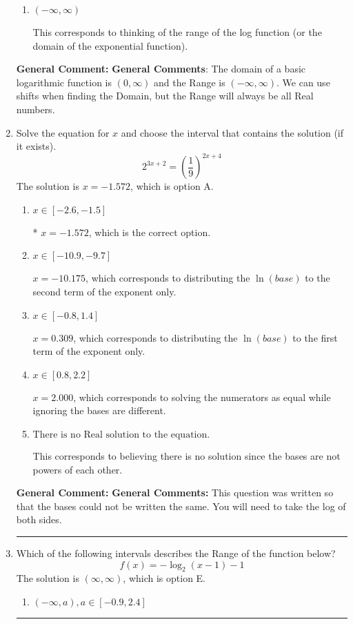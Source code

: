 \documentclass{extbook}[14pt]
\newcommand{\litem}[1]{\item #1

\rule{\textwidth}{0.4pt}}
\begin{document}
\begin{enumerate}
{\begin{enumerate}[label=\Alph*.]
$[-8, \infty)$, which corresponds to using the vertical shift when shifting the Domain AND including the endpoint.
\item \( (-\infty, \infty) \)

This corresponds to thinking of the range of the log function (or the domain of the exponential function).
\end{enumerate}

\textbf{General Comment:} \textbf{General Comments}: The domain of a basic logarithmic function is $(0, \infty)$ and the Range is $(-\infty, \infty)$. We can use shifts when finding the Domain, but the Range will always be all Real numbers.
}
\litem{
Solve the equation for $x$ and choose the interval that contains the solution (if it exists).
\[ 2^{3x+2} = \left(\frac{1}{9}\right)^{2x+4} \]The solution is \( x = -1.572 \), which is option A.\begin{enumerate}[label=\Alph*.]
\item \( x \in [-2.6, -1.5] \)

* $x = -1.572$, which is the correct option.
\item \( x \in [-10.9, -9.7] \)

$x = -10.175$, which corresponds to distributing the $\ln(base)$ to the second term of the exponent only.
\item \( x \in [-0.8, 1.4] \)

$x = 0.309$, which corresponds to distributing the $\ln(base)$ to the first term of the exponent only.
\item \( x \in [0.8, 2.2] \)

$x = 2.000$, which corresponds to solving the numerators as equal while ignoring the bases are different.
\item \( \text{There is no Real solution to the equation.} \)

This corresponds to believing there is no solution since the bases are not powers of each other.
\end{enumerate}

\textbf{General Comment:} \textbf{General Comments:} This question was written so that the bases could not be written the same. You will need to take the log of both sides.
}
\litem{
Which of the following intervals describes the Range of the function below?
\[ f(x) = -\log_2{(x-1)}-1 \]The solution is \( (\infty, \infty) \), which is option E.\begin{enumerate}[label=\Alph*.]
\item \( (-\infty, a), a \in [-0.9, 2.4] \)


\end{enumerate}}
\end{enumerate}
\end{document}
